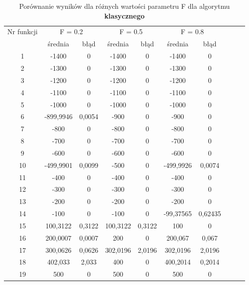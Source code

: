 \documentclass[a4paper,12pt]{article}
\theoremstyle{definition}
\begin{document}
\begin{table}[H]
\centering
\def\arraystretch{1.3}
\setlength\tabcolsep{10pt}
\caption{Porównanie wyników dla różnych wartości parametru F dla algorytmu \textbf{klasycznego}}
\vspace{8pt}
\begin{tabular}{|c|c|c|c|c|c|c|c|c|c|}
	\hline
	\multirow{2}{*}{Nr funkcji} & \multicolumn{2}{c|}{F = 0.2} & \multicolumn{2}{c|}{F = 0.5} & \multicolumn{2}{c|}{F = 0.8}\\
	\cline{2-7}
	& średnia & błąd & średnia & błąd & średnia & błąd \\\hline
	1     & -1400 & 0     & -1400 & 0     & -1400 & 0 \\\hline
    2     & -1300 & 0     & -1300 & 0     & -1300 & 0 \\\hline
    3     & -1200 & 0     & -1200 & 0     & -1200 & 0 \\\hline
    4     & -1100 & 0     & -1100 & 0     & -1100 & 0 \\\hline
    5     & -1000 & 0     & -1000 & 0     & -1000 & 0 \\\hline
    6     & -899,9946 & 0,0054 & -900  & 0     & -900  & 0 \\\hline
    7     & -800  & 0     & -800  & 0     & -800  & 0 \\\hline
    8     & -700  & 0     & -700  & 0     & -700  & 0 \\\hline
    9     & -600  & 0     & -600  & 0     & -600  & 0 \\\hline
    10    & -499,9901 & 0,0099 & -500  & 0     & -499,9926 & 0,0074 \\\hline
    11    & -400  & 0     & -400  & 0     & -400  & 0 \\\hline
    12    & -300  & 0     & -300  & 0     & -300  & 0 \\\hline
    13    & -200  & 0     & -200  & 0     & -200  & 0 \\\hline
    14    & -100  & 0     & -100  & 0     & -99,37565 & 0,62435 \\\hline
    15    & 100,3122 & 0,3122 & 100,3122 & 0,3122 & 100   & 0 \\\hline
    16    & 200,0007 & 0,0007 & 200   & 0     & 200,067 & 0,067 \\\hline
    17    & 300,0626 & 0,0626 & 302,0196 & 2,0196 & 302,0196 & 2,0196 \\\hline
    18    & 402,033 & 2,033 & 400   & 0     & 400,2014 & 0,2014 \\\hline
    19    & 500   & 0     & 500   & 0     & 500   & 0 \\\hline

\end{tabular}
\end{table}
\end{document}

